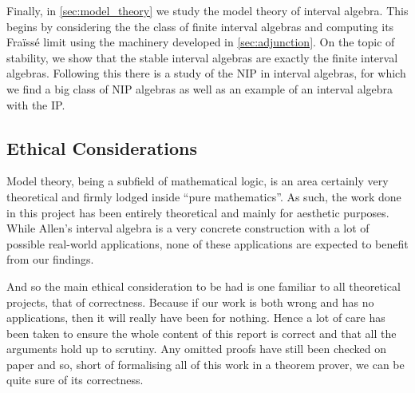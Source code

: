 Finally, in \cref{sec:model_theory} we study the model theory of interval algebra. This
begins by considering the the class of finite interval algebras and computing its
Fraïssé limit using the machinery developed in \cref{sec:adjunction}. On the topic of
stability, we show that the stable interval algebras are exactly the finite interval
algebras. Following this there is a study of the NIP in interval algebras, for which
we find a big class of NIP algebras as well as an example of an interval algebra with the
IP.

\subsection{Ethical Considerations}

Model theory, being a subfield of mathematical logic, is an area certainly very theoretical and
firmly lodged inside ``pure mathematics''. As such, the work done in this project has been
entirely theoretical and mainly for aesthetic purposes. While Allen's interval algebra is a very
concrete construction with a lot of possible real-world applications, none of these applications
are expected to benefit from our findings.

And so the main ethical consideration to be had is one familiar to all theoretical projects, that
of correctness. Because if our work is both wrong and has no applications, then it will really
have been for nothing. Hence a lot of care has been taken to ensure the whole content of this report
is correct and that all the arguments hold up to scrutiny. Any omitted proofs have still been
checked on paper and so, short of formalising all of this work in a theorem prover, we can be quite
sure of its correctness.
